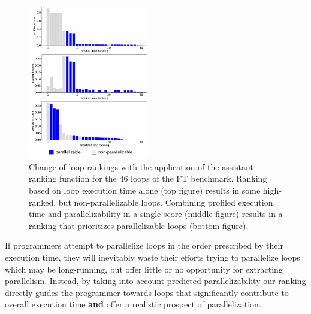\begin{figure}[ht]
\includegraphics[width=0.47\textwidth]{images/ft_filter.pdf}
\caption{Change of loop rankings with the application of the assistant ranking function for the 46 loops of the FT benchmark. Ranking based on loop execution time alone (top figure) results in some high-ranked, but non-parallelizable loops. Combining profiled execution time and parallelizability in a single score (middle figure) results in a ranking that prioritizes parallelizable loops (bottom figure).}
\label{fig:ft_loop_ranking}
\end{figure}

If programmers attempt to parallelize loops in the order prescribed by their execution time, they will inevitably waste
their efforts trying to parallelize loops which may be long-running, but offer little or no opportunity for extracting parallelism. Instead, by taking into account predicted parallelizability our ranking directly guides the programmer towards loops that significantly contribute to overall execution time \textbf{and} offer a realistic prospect of parallelization.

